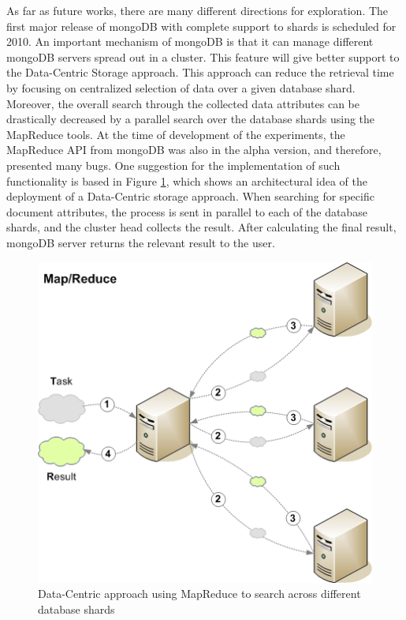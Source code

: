 As far as future works, there are many different directions for exploration.
The first major release of mongoDB with complete support to shards is
scheduled for 2010. An important mechanism of mongoDB is that it can
manage different mongoDB servers spread out in a cluster. This feature will give
better support to the Data-Centric Storage approach. This approach can reduce
the retrieval time by focusing on centralized selection of data over a given
database shard. Moreover, the overall search through the collected data
attributes can be drastically decreased by a parallel search over the database
shards using the MapReduce \cite{map-reduce} tools. At the time of development
of the experiments, the MapReduce API from mongoDB was also in the alpha
version, and therefore, presented many bugs. One suggestion for the
implementation of such functionality is based in Figure
\ref{fig:future-works-data-centric-map-reduce}, which shows an architectural
idea of the deployment of a Data-Centric storage approach. When searching for
specific document attributes, the process is sent in parallel to each of the
database shards, and the cluster head collects the result. After calculating
the final result, mongoDB server returns the relevant result to the user. 

\begin{figure}[!h]
  \centering
  \includegraphics[scale=0.65]{../diagrams/future-works-data-centric-map-reduce}
  \caption{Data-Centric approach using MapReduce to search across different
  database shards}
  \label{fig:future-works-data-centric-map-reduce}
\end{figure}

